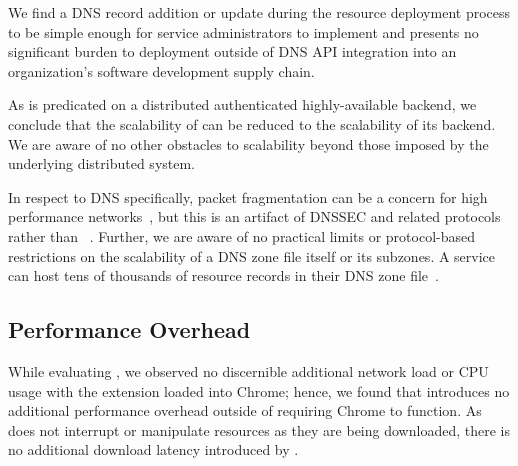 We find a DNS record addition or update during the resource deployment process
to be simple enough for service administrators to implement and presents no
significant burden to deployment outside of DNS API integration into an
organization's software development supply chain.

As \SYSTEM{} is predicated on a distributed authenticated highly-available
backend, we conclude that the scalability of \SYSTEM{} can be reduced to the
scalability of its backend. We are aware of no other obstacles to scalability
beyond those imposed by the underlying distributed system.

In respect to DNS specifically, packet fragmentation can be a concern for high
performance networks~\cite{EDNS}, but this is an artifact of DNSSEC and related
protocols rather than \SYSTEM{}~\cite{DNSSEC}. Further, we are aware of no
practical limits or protocol-based restrictions on the scalability of a DNS zone
file itself or its subzones. A service can host tens of thousands of resource
records in their DNS zone file~\cite{DNS1, DNS2}.

\subsection{Performance Overhead}

While evaluating \SYSTEM{}, we observed no discernible additional network load
or CPU usage with the extension loaded into Chrome; hence, we found that
\SYSTEM{} introduces no additional performance overhead outside of requiring
Chrome to function. As \SYSTEM{} does not interrupt or manipulate resources as
they are being downloaded, there is no additional download latency introduced by
\SYSTEM{}.
